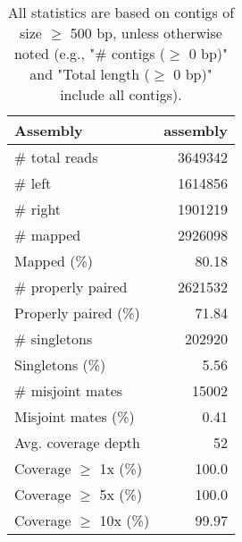 \documentclass[12pt,a4paper]{article}
\begin{document}
\begin{table}[ht]
\begin{center}
\caption{All statistics are based on contigs of size $\geq$ 500 bp, unless otherwise noted (e.g., "\# contigs ($\geq$ 0 bp)" and "Total length ($\geq$ 0 bp)" include all contigs).}
\begin{tabular}{|l*{1}{|r}|}
\hline
Assembly & assembly \\ \hline
\# total reads & 3649342 \\ \hline
\# left & 1614856 \\ \hline
\# right & 1901219 \\ \hline
\# mapped & 2926098 \\ \hline
Mapped (\%) & 80.18 \\ \hline
\# properly paired & 2621532 \\ \hline
Properly paired (\%) & 71.84 \\ \hline
\# singletons & 202920 \\ \hline
Singletons (\%) & 5.56 \\ \hline
\# misjoint mates & 15002 \\ \hline
Misjoint mates (\%) & 0.41 \\ \hline
Avg. coverage depth & 52 \\ \hline
Coverage $\geq$ 1x (\%) & 100.0 \\ \hline
Coverage $\geq$ 5x (\%) & 100.0 \\ \hline
Coverage $\geq$ 10x (\%) & 99.97 \\ \hline
\end{tabular}
\end{center}
\end{table}
\end{document}
